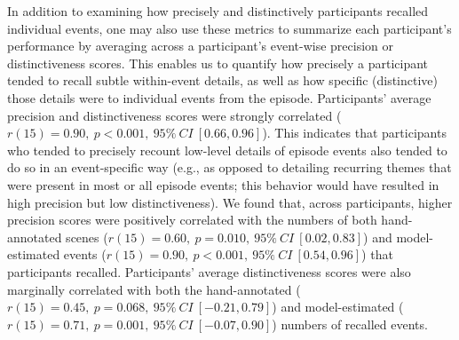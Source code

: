\documentclass[10pt]{article}
\begin{document}
In addition to examining how precisely and distinctively participants recalled individual events, one may also use these metrics to summarize each participant's performance by averaging across a participant's event-wise precision or distinctiveness scores.  This enables us to quantify how precisely a participant tended to recall subtle within-event details, as well as how specific (distinctive) those details were to individual events from the episode.  Participants' average precision and distinctiveness scores were strongly correlated ($r(15) = 0.90,~p < 0.001,~95\%~CI~[0.66, 0.96]$).  This indicates that participants who tended to precisely recount low-level details of episode events also tended to do so in an event-specific way (e.g., as opposed to detailing recurring themes that were present in most or all episode events; this behavior would have resulted in high precision but low distinctiveness).  We found that, across participants, higher precision scores were positively correlated with the numbers of both hand-annotated scenes ($r(15) = 0.60,~p = 0.010,~95\%~CI~[0.02, 0.83]$) and model-estimated events ($r(15) = 0.90,~p < 0.001,~95\%~CI~[0.54, 0.96]$) that participants recalled.  Participants' average distinctiveness scores were also marginally correlated with both the hand-annotated ($r(15) = 0.45,~p = 0.068,~95\%~CI~[-0.21, 0.79]$) and model-estimated ($r(15) = 0.71,~p = 0.001,~95\%~CI~[-0.07, 0.90]$) numbers of recalled events.
\end{document}
